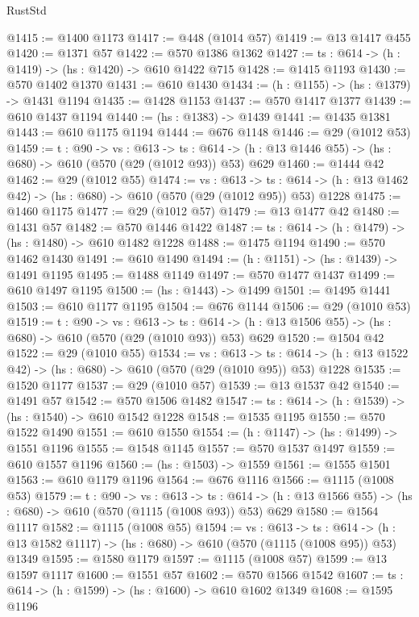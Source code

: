 \begin{lexlean}{RustStd}
\begin{coremodule}
@1415 := @1400 @1173
@1417 := @448 (@1014 @57)
@1419 := @13 @1417 @455
@1420 := @1371 @57
@1422 := @570 @1386 @1362
@1427 := {ts : @614} -> (h : @1419) -> (hs : @1420) -> @610 @1422 @715
@1428 := @1415 @1193
@1430 := @570 @1402 @1370
@1431 := @610 @1430
@1434 := (h : @1155) -> (hs : @1379) -> @1431 @1194
@1435 := @1428 @1153
@1437 := @570 @1417 @1377
@1439 := @610 @1437 @1194
@1440 := (hs : @1383) -> @1439
@1441 := @1435 @1381
@1443 := @610 @1175 @1194
@1444 := @676 @1148
@1446 := @29 (@1012 @53)
@1459 := {t : @90} ->
  {vs : @613} ->
  {ts : @614} -> (h : @13 @1446 @55) -> (hs : @680) -> @610 (@570 (@29 (@1012 @93)) @53) @629
@1460 := @1444 @42
@1462 := @29 (@1012 @55)
@1474 := {vs : @613} ->
  {ts : @614} -> (h : @13 @1462 @42) -> (hs : @680) -> @610 (@570 (@29 (@1012 @95)) @53) @1228
@1475 := @1460 @1175
@1477 := @29 (@1012 @57)
@1479 := @13 @1477 @42
@1480 := @1431 @57
@1482 := @570 @1446 @1422
@1487 := {ts : @614} -> (h : @1479) -> (hs : @1480) -> @610 @1482 @1228
@1488 := @1475 @1194
@1490 := @570 @1462 @1430
@1491 := @610 @1490
@1494 := (h : @1151) -> (hs : @1439) -> @1491 @1195
@1495 := @1488 @1149
@1497 := @570 @1477 @1437
@1499 := @610 @1497 @1195
@1500 := (hs : @1443) -> @1499
@1501 := @1495 @1441
@1503 := @610 @1177 @1195
@1504 := @676 @1144
@1506 := @29 (@1010 @53)
@1519 := {t : @90} ->
  {vs : @613} ->
  {ts : @614} -> (h : @13 @1506 @55) -> (hs : @680) -> @610 (@570 (@29 (@1010 @93)) @53) @629
@1520 := @1504 @42
@1522 := @29 (@1010 @55)
@1534 := {vs : @613} ->
  {ts : @614} -> (h : @13 @1522 @42) -> (hs : @680) -> @610 (@570 (@29 (@1010 @95)) @53) @1228
@1535 := @1520 @1177
@1537 := @29 (@1010 @57)
@1539 := @13 @1537 @42
@1540 := @1491 @57
@1542 := @570 @1506 @1482
@1547 := {ts : @614} -> (h : @1539) -> (hs : @1540) -> @610 @1542 @1228
@1548 := @1535 @1195
@1550 := @570 @1522 @1490
@1551 := @610 @1550
@1554 := (h : @1147) -> (hs : @1499) -> @1551 @1196
@1555 := @1548 @1145
@1557 := @570 @1537 @1497
@1559 := @610 @1557 @1196
@1560 := (hs : @1503) -> @1559
@1561 := @1555 @1501
@1563 := @610 @1179 @1196
@1564 := @676 @1116
@1566 := @1115 (@1008 @53)
@1579 := {t : @90} ->
  {vs : @613} ->
  {ts : @614} -> (h : @13 @1566 @55) -> (hs : @680) -> @610 (@570 (@1115 (@1008 @93)) @53) @629
@1580 := @1564 @1117
@1582 := @1115 (@1008 @55)
@1594 := {vs : @613} ->
  {ts : @614} -> (h : @13 @1582 @1117) -> (hs : @680) -> @610 (@570 (@1115 (@1008 @95)) @53) @1349
@1595 := @1580 @1179
@1597 := @1115 (@1008 @57)
@1599 := @13 @1597 @1117
@1600 := @1551 @57
@1602 := @570 @1566 @1542
@1607 := {ts : @614} -> (h : @1599) -> (hs : @1600) -> @610 @1602 @1349
@1608 := @1595 @1196

\end{coremodule}
\end{lexlean}
